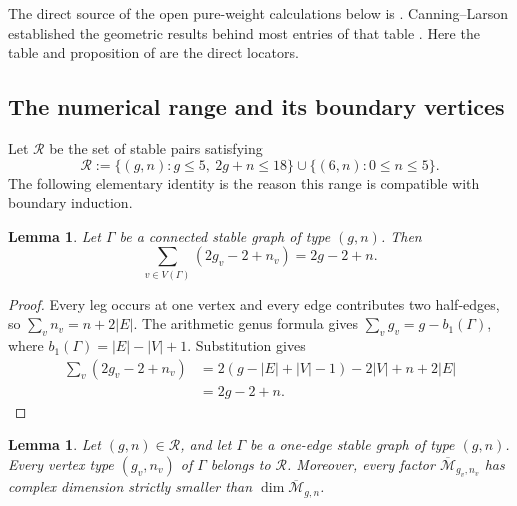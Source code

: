 \documentclass[12pt,reqno]{amsart}
\newcommand{\Mbar}{\overline{\mathcal{M}}}
\newtheorem{lemma}[theorem]{Lemma}
\theoremstyle{definition}
\theoremstyle{remark}
\begin{document}
The direct source of the open pure-weight calculations below is
\cite[Table~1 and Proposition~4.5]{CLP}.  Canning--Larson established the
geometric results behind most entries of that table \cite{CanningLarson}.
Here the table and proposition of \cite{CLP} are the direct locators.

\subsection{The numerical range and its boundary vertices}

Let $\mathcal R$ be the set of stable pairs satisfying
\begin{equation}\label{eq:range}
  \mathcal R
  :=\{(g,n):g\leq5,\ 2g+n\leq18\}
     \cup\{(6,n):0\leq n\leq5\}.
\end{equation}
The following elementary identity is the reason this range is compatible
with boundary induction.

\begin{lemma}\label{lem:marking-budget}
Let $\Gamma$ be a connected stable graph of type $(g,n)$.  Then
\begin{equation}\label{eq:budget}
 \sum_{v\in V(\Gamma)}(2g_v-2+n_v)=2g-2+n.
\end{equation}
\end{lemma}

\begin{proof}
Every leg occurs at one vertex and every edge contributes two half-edges, so
$\sum_v n_v=n+2|E|$.  The arithmetic genus formula gives
$\sum_v g_v=g-b_1(\Gamma)$, where
$b_1(\Gamma)=|E|-|V|+1$.  Substitution gives
\begin{align*}
 \sum_v(2g_v-2+n_v)
 &=2(g-|E|+|V|-1)-2|V|+n+2|E|\\
 &=2g-2+n.
\end{align*}
\end{proof}

\begin{lemma}\label{lem:range-closed}
Let $(g,n)\in\mathcal R$, and let $\Gamma$ be a one-edge stable graph of
type $(g,n)$.  Every vertex type $(g_v,n_v)$ of $\Gamma$ belongs to
$\mathcal R$.  Moreover, every factor $\Mbar_{g_v,n_v}$ has complex
dimension strictly smaller than $\dim\Mbar_{g,n}$.
\end{lemma}
\end{document}
